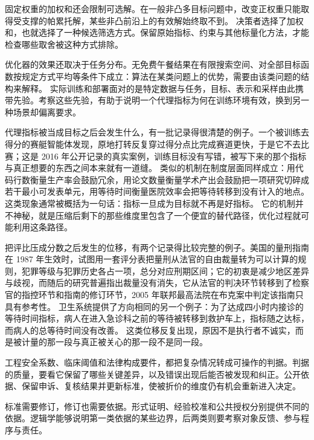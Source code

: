 固定权重的加权和还会限制可选解。在一般非凸多目标问题中，改变正权重只能取得受支撑的帕累托解，某些非凸前沿上的有效解始终取不到。\cite{das1997closer} 决策者选择了加权和，也就选择了一种候选筛选方式。保留原始指标、约束与其他标量化方法，才能检查哪些取舍被这种方式排除。


优化器的效果还取决于任务分布。无免费午餐结果在有限搜索空间、对全部目标函数按规定方式平均等条件下成立：算法在某类问题上的优势，需要由该类问题的结构来解释。\cite{wolpert1997no} 实际训练和部署面对的是特定数据与任务，目标、表示和采样由此携带先验。考察这些先验，有助于说明一个代理指标为何在训练环境有效，换到另一种场景却偏离要求。


代理指标被当成目标之后会发生什么，有一批记录得很清楚的例子。一个被训练去得分的赛艇智能体发现，原地打转反复穿过得分点比完成赛道更快，于是它不去比赛；这是 2016 年公开记录的真实案例，训练目标没有写错，被写下来的那个指标与真正想要的东西之间本来就有一道缝。\cite{amodei2016concrete} 类似的机制在制度层面同样成立：用代码行数衡量生产率会鼓励冗余，用论文数量衡量学术产出会鼓励把一项研究切碎成若干最小可发表单元，用等待时间衡量医院效率会把等待转移到没有计入的地点。这类现象通常被概括为一句话：指标一旦成为目标就不再是好指标。\cite{goodhart1975problems}\cite{strathern1997audit} 它的机制并不神秘，就是压缩后剩下的那些维度里包含了一个便宜的替代路径，优化过程就可能利用这条路径。

把评比压成分数之后发生的位移，有两个记录得比较完整的例子。美国的量刑指南在 1987 年生效时，试图用一套评分表把量刑从法官的自由裁量转为可以计算的规则，犯罪等级与犯罪历史各占一项，总分对应刑期区间；它的初衷是减少地区差异与歧视，而随后的研究普遍指出裁量没有消失，它从法官的判决环节转移到了检察官的指控环节和指南的修订环节，2005 年联邦最高法院在布克案中判定该指南只具有参考性。\cite{us2005booker} 卫生系统提供了方向相同的另一个例子：为了达成四小时内接诊的等待时间指标，病人在进入急诊科之前的等待被转移到救护车上，指标随之达标，而病人的总等待时间没有改善。 这类位移反复出现，原因不是执行者不诚实，而是被计量的那一段与真正被关心的那一段不是同一段。


工程安全系数、临床阈值和法律构成要件，都把复杂情况转成可操作的判据。判据的质量，要看它保留了哪些关键差异，以及错误出现后能否被发现和纠正。公开依据、保留申诉、复核结果并更新标准，使被折价的维度仍有机会重新进入决定。\cite{ashby1956cybernetics}

标准需要修订，修订也需要依据。形式证明、经验校准和公共授权分别提供不同的依据。逻辑学能够说明第一类依据的某些边界，后两类则要考察对象反馈、参与程序与责任。

